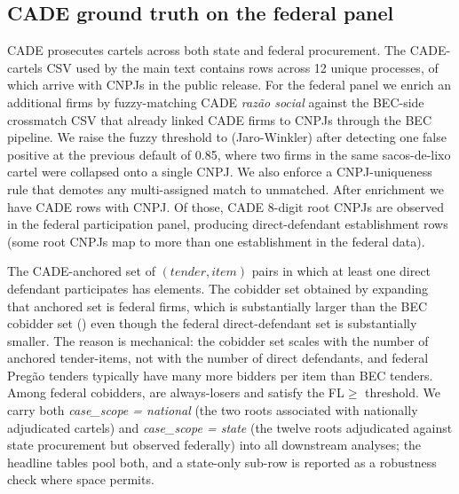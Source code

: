 \subsection{CADE ground truth on the federal panel}
\label{app:comprasnet_linkage}

CADE prosecutes cartels across both state and federal procurement.
The CADE-cartels CSV used by the main text contains
\valFedCadeRows{} rows across 12 unique processes, of which
\valFedCadeWithCNPJ{} arrive with CNPJs in the public release.
For the federal panel we enrich an additional \valFedCadeEnrichedBEC{}
firms by fuzzy-matching CADE \emph{razão social} against the
BEC-side crossmatch CSV that already linked CADE firms to CNPJs
through the BEC pipeline. We raise the fuzzy threshold to
\valFedFuzzyThreshold{} (Jaro-Winkler) after detecting one false
positive at the previous default of 0.85, where two firms in the
same sacos-de-lixo cartel were collapsed onto a single CNPJ. We
also enforce a CNPJ-uniqueness rule that demotes any
multi-assigned match to unmatched. After enrichment we have
\valFedCadeEnrichedTotal{} CADE rows with CNPJ. Of those,
\valFedRaizesMatched{} CADE 8-digit root CNPJs are observed in
the federal participation panel, producing \valFedDirects{}
direct-defendant establishment rows (some root CNPJs map to more
than one establishment in the federal data).

The CADE-anchored set of $(\textit{tender}, \textit{item})$ pairs
in which at least one direct defendant participates has
\valFedAnchoredTenders{} elements. The cobidder set obtained by
expanding that anchored set is \valFedCobidders{} federal firms,
which is substantially larger than the BEC cobidder set
(\valMainCobidders) even though the federal direct-defendant set is
substantially smaller. The reason is mechanical: the cobidder set
scales with the number of anchored tender-items, not with the
number of direct defendants, and federal Pregão tenders typically
have many more bidders per item than BEC tenders. Among federal
cobidders, \valFedALcobidders{} are always-losers and
\valFedFLcobidders{} satisfy the FL$\geq$\valFedFLthreshold{}
threshold. We carry both \emph{case\_scope = national} (the two
roots associated with nationally adjudicated cartels) and
\emph{case\_scope = state} (the twelve roots adjudicated against
state procurement but observed federally) into all downstream
analyses; the headline tables pool both, and a state-only sub-row
is reported as a robustness check where space permits.

